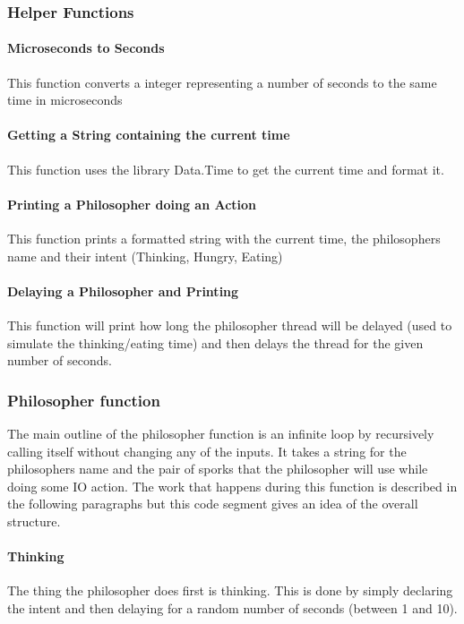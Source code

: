 \documentclass[a4paper]{article}
\begin{document}
\subsubsection{Helper Functions}
\paragraph{Microseconds to Seconds}
This function converts a integer representing a number of seconds to the same time in microseconds

\paragraph{Getting a String containing the current time}
This function uses the library Data.Time to get the current time and format it.

\paragraph{Printing a Philosopher doing an Action}
This function prints a formatted string with the current time, the philosophers name and their intent (Thinking, Hungry, Eating)

\paragraph{Delaying a Philosopher and Printing}
This function will print how long the philosopher thread will be delayed (used to simulate the thinking/eating time) and then delays the thread for the given number of seconds.


\subsubsection{Philosopher function}
The main outline of the philosopher function is an infinite loop by recursively calling itself without changing any of the inputs.
It takes a string for the philosophers name and the pair of sporks that the philosopher will use while doing some IO action.
The work that happens during this function is described in the following paragraphs but this code segment gives an idea of the overall structure.

\paragraph{Thinking}
The thing the philosopher does first is thinking.
This is done by simply declaring the intent and then delaying for a random number of seconds (between 1 and 10).

\end{document}
